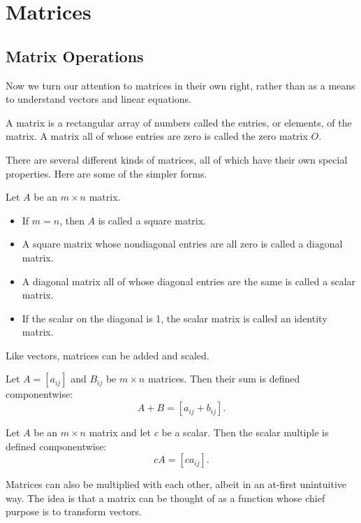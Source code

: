 \documentclass[../m073main.tex]{subfiles}
\begin{document}
\chapter{Matrices}
\section{Matrix Operations}
Now we turn our attention to matrices in their own right, rather than as a means to understand vectors and linear equations.

\begin{definition}[Matrix]
	A matrix is a rectangular array of numbers called the entries, or elements, of the matrix.
	A matrix all of whose entries are zero is called the zero matrix $O$.
\end{definition}

There are several different kinds of matrices, all of which have their own special properties.
Here are some of the simpler forms.

\begin{definition}
	Let $A$ be an $m \times n$ matrix.
	\begin{itemize}
		\item If $ m =n$, then $A$ is called a square matrix.
		\item A square matrix whose nondiagonal entries are all zero is called a diagonal matrix.
		\item A diagonal matrix all of whose diagonal entries are the same is called a scalar matrix.
		\item If the scalar on the diagonal is 1, the scalar matrix is called an identity matrix.
	\end{itemize}
\end{definition}

Like vectors, matrices can be added and scaled.

\begin{definition}
	Let $A = [a_{ij}]$ and $B_{ij}$ be $m \times n$ matrices.
	Then their sum is defined componentwise:
	\[ A + B = [a_{ij} + b_{ij}]. \]
\end{definition}

\begin{definition}
	Let $A$ be an $m\times n$ matrix and let $c$ be a scalar.
	Then the scalar multiple is defined componentwise:
	\[ cA = [ca_{ij}]. \]
\end{definition}

Matrices can also be multiplied with each other, albeit in an at-first unintuitive way.
The idea is that a matrix can be thought of as a function whose chief purpose is to transform vectors.
\end{document}
